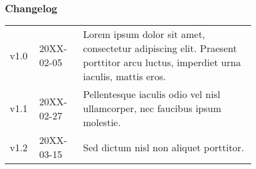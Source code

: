 \begin{twothirdswidth}
        \vfill %

        \subsubsection*{Changelog}

        \scriptsize %

        \begin{tabular}{@{} L{0.05\linewidth} L{0.15\linewidth} L{0.6\linewidth} @{}} %
            \toprule
            v1.0 & 20XX-02-05 & Lorem ipsum dolor sit amet, consectetur adipiscing elit. Praesent porttitor arcu luctus, imperdiet urna iaculis, mattis eros.\\
            v1.1 & 20XX-02-27 & Pellentesque iaculis odio vel nisl ullamcorper, nec faucibus ipsum molestie.\\
            v1.2 & 20XX-03-15 & Sed dictum nisl non aliquet porttitor.\\
            \bottomrule
        \end{tabular}
    \end{twothirdswidth}

